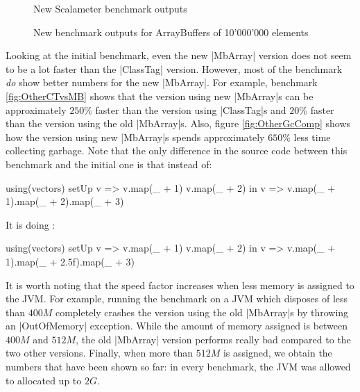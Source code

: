 \begin{figure}
\caption{New Scalameter benchmark outputs}
\label{fig:NewCTvsMB}
\end{figure}  

\begin{figure}
\caption{New benchmark outputs for ArrayBuffers of 10'000'000 elements}
\label{fig:NewGcComp}
\end{figure}

Looking at the initial benchmark, even the new |MbArray| version does not seem to be a lot faster than the |ClassTag| version. However, most of the benchmark \emph{do} show better numbers for the new |MbArray|. For example, benchmark \ref{fig:OtherCTvsMB} shows that the version using new |MbArray|s can be approximately $250\%$ faster than the version using |ClassTag|s and $20\%$ faster than the version using the old |MbArray|s. Also, figure \ref{fig:OtherGcComp} shows how the version using new |MbArray|s spends approximately $650\%$ less time collecting garbage. Note that the only difference in the source code between this benchmark and the initial one is that instead of:

\begin{lstlisting-nobreak}
  using(vectors) setUp {
    v => 
      v.map(_ + 1)
      v.map(_ + 2)
  } in {
    v => v.map(_ + 1).map(_ + 2).map(_ + 3)
  }
\end{lstlisting-nobreak}

It is doing : 

\begin{lstlisting-nobreak}
  using(vectors) setUp {
    v => 
      v.map(_ + 1)
      v.map(_ + 2)
  } in {
    v => v.map(_ + 1).map(_ + 2.5f).map(_ + 3)
  }
\end{lstlisting-nobreak}

It is worth noting that the speed factor increases when less memory is assigned to the JVM. For example, running the benchmark on a JVM which disposes of less than $400M$ completely crashes the version using the old |MbArray|s by throwing an |OutOfMemory| exception. While the amount of memory assigned is between $400M$ and $512M$, the old |MbArray| version performs really bad compared to the two other versions. Finally, when more than $512M$ is assigned, we obtain the numbers that have been shown so far: in every benchmark, the JVM was allowed to allocated up to $2G$.


